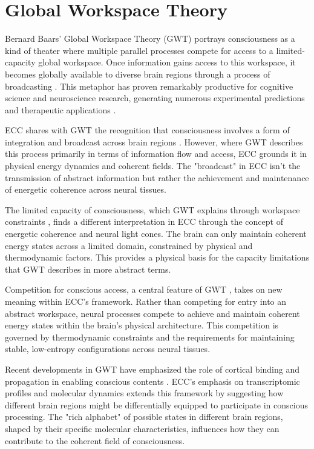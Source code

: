 \section{Global Workspace Theory}

Bernard Baars' Global Workspace Theory (GWT) portrays consciousness as a kind of theater where multiple parallel processes compete for access to a limited-capacity global workspace. Once information gains access to this workspace, it becomes globally available to diverse brain regions through a process of broadcasting \cite{Baars1988}. This metaphor has proven remarkably productive for cognitive science and neuroscience research, generating numerous experimental predictions and therapeutic applications \cite{Dehaene2001}.

ECC shares with GWT the recognition that consciousness involves a form of integration and broadcast across brain regions \cite{Baars2002}. However, where GWT describes this process primarily in terms of information flow and access, ECC grounds it in physical energy dynamics and coherent fields. The "broadcast" in ECC isn't the transmission of abstract information but rather the achievement and maintenance of energetic coherence across neural tissues.

The limited capacity of consciousness, which GWT explains through workspace constraints \cite{Dehaene2006}, finds a different interpretation in ECC through the concept of energetic coherence and neural light cones. The brain can only maintain coherent energy states across a limited domain, constrained by physical and thermodynamic factors. This provides a physical basis for the capacity limitations that GWT describes in more abstract terms.

Competition for conscious access, a central feature of GWT \cite{Dehaene2011}, takes on new meaning within ECC's framework. Rather than competing for entry into an abstract workspace, neural processes compete to achieve and maintain coherent energy states within the brain's physical architecture. This competition is governed by thermodynamic constraints and the requirements for maintaining stable, low-entropy configurations across neural tissues.

Recent developments in GWT have emphasized the role of cortical binding and propagation in enabling conscious contents \cite{Baars2013}. ECC's emphasis on transcriptomic profiles and molecular dynamics extends this framework by suggesting how different brain regions might be differentially equipped to participate in conscious processing. The "rich alphabet" of possible states in different brain regions, shaped by their specific molecular characteristics, influences how they can contribute to the coherent field of consciousness.

